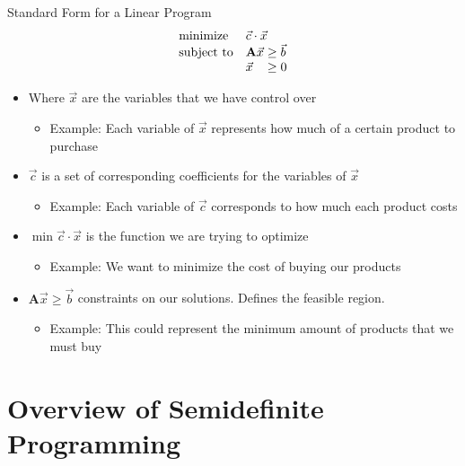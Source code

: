 \documentclass[
	11pt, %
]{beamer}
\begin{document}
\begin{frame}[label={sec:orgc3bccc9}]{Standard Form for a Linear Program}
\begin{align*}
  \begin{array}{ll@{}ll}
    \text{minimize}   & \vec{c} \cdot \vec{x}& \\
    \text{subject to} & \mathbf{A} \vec{x} &\geq  \vec{b} \\
                      & \vec{x} &\geq 0 \\
    \end{array}
\end{align*}
\pause
\begin{itemize}
\item Where \(\vec{x}\) are the variables that we have control over
\begin{itemize}
\item Example: Each variable of \(\vec{x}\) represents how much of a certain
product to purchase
\end{itemize}
\pause
\item \(\vec{c}\) is a set of corresponding coefficients for the variables of \(\vec{x}\)
\begin{itemize}
\item Example: Each variable of \(\vec{c}\) corresponds to how much each product costs
\end{itemize}
\pause
\item \(\min \vec{c} \cdot \vec{x}\) is the function we are trying to optimize
\begin{itemize}
\item Example: We want to minimize the cost of buying our products
\end{itemize}
\pause
\item \(\mathbf{A} \vec{x} \geq \vec{b}\) constraints on our solutions. Defines the
feasible region.
\begin{itemize}
\item Example: This could represent the minimum amount of products
that we must buy
\end{itemize}
\pause
\end{itemize}
\end{frame}

\section{Overview of Semidefinite Programming}
\end{document}
